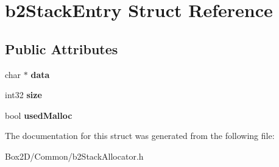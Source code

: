 \hypertarget{structb2_stack_entry}{}\section{b2\+Stack\+Entry Struct Reference}
\label{structb2_stack_entry}
\subsection*{Public Attributes}
\begin{DoxyCompactItemize}
\item 
\mbox{\label{structb2_stack_entry_af98aedeec2c20af0b7d3508a687ddd86}} 
char $\ast$ {\bfseries data}
\item 
\mbox{\label{structb2_stack_entry_a910c62f05317f8906224b2569e0cb344}} 
int32 {\bfseries size}
\item 
\mbox{\label{structb2_stack_entry_a581b5e4699bb66a28ec0727497a4e478}} 
bool {\bfseries used\+Malloc}
\end{DoxyCompactItemize}


The documentation for this struct was generated from the following file\+:\begin{DoxyCompactItemize}
\item 
Box2\+D/\+Common/b2\+Stack\+Allocator.\+h\end{DoxyCompactItemize}
